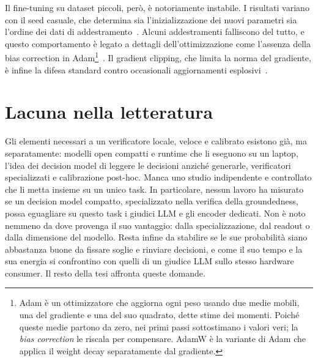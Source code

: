 Il fine-tuning su dataset piccoli, però, è notoriamente instabile. I risultati variano con il seed casuale, che determina
sia l'inizializzazione dei nuovi parametri sia l'ordine dei dati di addestramento~\cite{dodge2020finetuning}. Alcuni
addestramenti falliscono del tutto, e questo comportamento è legato a dettagli dell'ottimizzazione come l'assenza della
bias correction in Adam\footnote{Adam è un ottimizzatore che aggiorna ogni peso usando due medie mobili, una del
gradiente e una del suo quadrato, dette stime dei momenti. Poiché queste medie partono da zero, nei primi passi
sottostimano i valori veri; la \emph{bias correction} le riscala per compensare. AdamW è la variante di Adam che applica
il weight decay separatamente dal gradiente.}~\cite{mosbach2021stability}. Il gradient clipping, che limita la norma del
gradiente, è infine la difesa standard contro occasionali aggiornamenti esplosivi~\cite{pascanu2013difficulty}.

\section{Lacuna nella letteratura}
\label{sec:bg-gap}

Gli elementi necessari a un verificatore locale, veloce e calibrato esistono già, ma separatamente: modelli open
compatti e runtime che li eseguono su un laptop, l'idea dei decision model di leggere le decisioni anziché generarle,
verificatori specializzati e calibrazione post-hoc. Manca uno studio indipendente e controllato che li metta insieme su un
unico task. In particolare, nessun lavoro ha misurato se un decision model compatto, specializzato nella verifica della
groundedness, possa eguagliare su questo task i giudici LLM e gli encoder dedicati. Non è noto nemmeno da dove
provenga il suo vantaggio: dalla specializzazione, dal readout o dalla dimensione del modello. Resta infine da
stabilire se le sue probabilità siano abbastanza buone da fissare soglie e rinviare decisioni, e come il suo tempo e la
sua energia si confrontino con quelli di un giudice LLM sullo stesso hardware consumer. Il resto della tesi affronta queste
domande.
